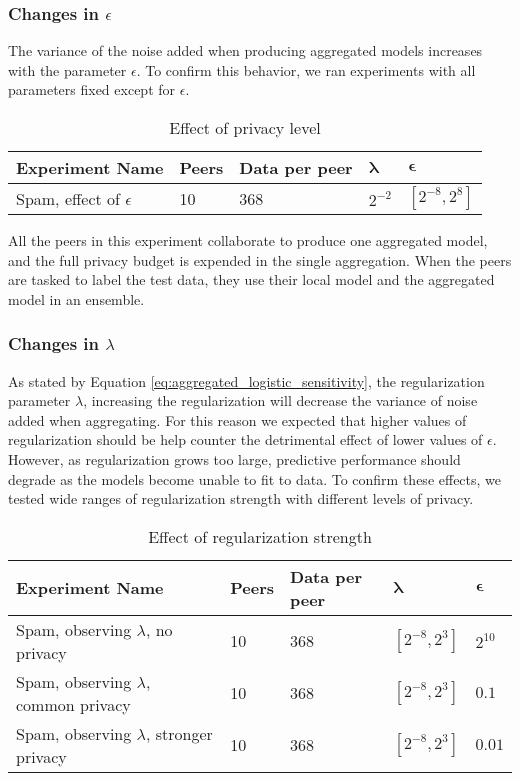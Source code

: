 \subsubsection{Changes in $\epsilon$}

The variance of the noise added when producing aggregated models increases with the parameter $\epsilon$. To confirm this behavior, we ran experiments with all parameters fixed except for $\epsilon$.

\begin{table}[h]
	\centering
	\begin{tabular}{|l|l|l|l|l|}
		\textbf{Experiment Name}            & \textbf{Peers} & \textbf{Data per peer} &
		 $\boldsymbol{\lambda}$ & $\boldsymbol{\epsilon}$                                              \\
		 \hline
		Spam, effect of $\epsilon$ & 10    & 368  & $2^{-2}$  & $[2^{-8}, 2^{8}]$
	\end{tabular}
	\caption{Effect of privacy level}
	\label{tab:experiments_privacy_level}
\end{table}

All the peers in this experiment collaborate to produce one aggregated model, and the full privacy budget is expended in the single aggregation. When the peers are tasked to label the test data, they use their local model and the aggregated model in an ensemble.

\subsubsection{Changes in $\lambda$}

As stated by Equation \ref{eq:aggregated_logistic_sensitivity}, the regularization parameter $\lambda$, increasing the regularization will decrease the variance of noise added when aggregating. For this reason we expected that higher values of regularization should be help counter the detrimental effect of lower values of $\epsilon$. However, as regularization grows too large, predictive performance should degrade as the models become unable to fit to data. To confirm these effects, we tested wide ranges of regularization strength with different levels of privacy.

\begin{table}[h]
	\centering
	\begin{tabular}{|l|l|l|l|l|}
		\textbf{Experiment Name}    & \textbf{Peers} & \textbf{Data per peer} & $\boldsymbol{\lambda}$         & $\boldsymbol{\epsilon}$ \\
		\hline
		Spam, observing $\lambda$, no privacy       & 10    & 368  & $[2^{-8}, 2^{3}]$ & $2^{10}$   \\
		Spam, observing $\lambda$, common privacy   & 10    & 368  & $[2^{-8}, 2^{3}]$ & $0.1$      \\
		Spam, observing $\lambda$, stronger privacy & 10    & 368  & $[2^{-8}, 2^{3}]$ & $0.01$    
	\end{tabular}
	\caption{Effect of regularization strength}
	\label{tab:experiments_regularization_strength}
\end{table}

